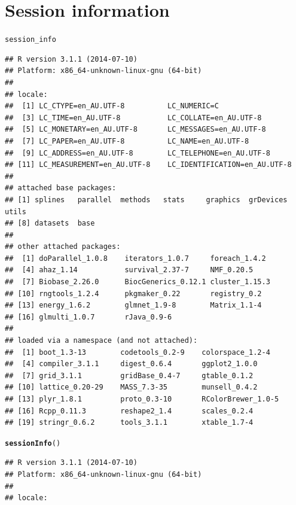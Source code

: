 \documentclass{article}\usepackage[]{graphicx}\usepackage[]{color}
\makeatletter
\newcommand{\hlstd}[1]{\textcolor[rgb]{0.345,0.345,0.345}{#1}}%
\newcommand{\hlkwd}[1]{\textcolor[rgb]{0.737,0.353,0.396}{\textbf{#1}}}%
\newenvironment{kframe}{%
 \def\at@end@of@kframe{}%
 \ifinner\ifhmode%
  \def\at@end@of@kframe{\end{minipage}}%
  \begin{minipage}{\columnwidth}%
 \fi\fi%
 \def\FrameCommand##1{\hskip\@totalleftmargin \hskip-\fboxsep
 \colorbox{shadecolor}{##1}\hskip-\fboxsep
     \hskip-\linewidth \hskip-\@totalleftmargin \hskip\columnwidth}%
 \MakeFramed {\advance\hsize-\width
   \@totalleftmargin\z@ \linewidth\hsize
   \@setminipage}}%
 {\par\unskip\endMakeFramed%
 \at@end@of@kframe}
\newenvironment{knitrout}{}{} %
\makeatother
\begin{document}
\section{Session information}
\begin{knitrout}
\color{fgcolor}\begin{kframe}
\begin{alltt}
\hlstd{session_info}
\end{alltt}
\begin{verbatim}
## R version 3.1.1 (2014-07-10)
## Platform: x86_64-unknown-linux-gnu (64-bit)
## 
## locale:
##  [1] LC_CTYPE=en_AU.UTF-8          LC_NUMERIC=C                 
##  [3] LC_TIME=en_AU.UTF-8           LC_COLLATE=en_AU.UTF-8       
##  [5] LC_MONETARY=en_AU.UTF-8       LC_MESSAGES=en_AU.UTF-8      
##  [7] LC_PAPER=en_AU.UTF-8          LC_NAME=en_AU.UTF-8          
##  [9] LC_ADDRESS=en_AU.UTF-8        LC_TELEPHONE=en_AU.UTF-8     
## [11] LC_MEASUREMENT=en_AU.UTF-8    LC_IDENTIFICATION=en_AU.UTF-8
## 
## attached base packages:
## [1] splines   parallel  methods   stats     graphics  grDevices utils    
## [8] datasets  base     
## 
## other attached packages:
##  [1] doParallel_1.0.8    iterators_1.0.7     foreach_1.4.2      
##  [4] ahaz_1.14           survival_2.37-7     NMF_0.20.5         
##  [7] Biobase_2.26.0      BiocGenerics_0.12.1 cluster_1.15.3     
## [10] rngtools_1.2.4      pkgmaker_0.22       registry_0.2       
## [13] energy_1.6.2        glmnet_1.9-8        Matrix_1.1-4       
## [16] glmulti_1.0.7       rJava_0.9-6        
## 
## loaded via a namespace (and not attached):
##  [1] boot_1.3-13        codetools_0.2-9    colorspace_1.2-4  
##  [4] compiler_3.1.1     digest_0.6.4       ggplot2_1.0.0     
##  [7] grid_3.1.1         gridBase_0.4-7     gtable_0.1.2      
## [10] lattice_0.20-29    MASS_7.3-35        munsell_0.4.2     
## [13] plyr_1.8.1         proto_0.3-10       RColorBrewer_1.0-5
## [16] Rcpp_0.11.3        reshape2_1.4       scales_0.2.4      
## [19] stringr_0.6.2      tools_3.1.1        xtable_1.7-4
\end{verbatim}
\begin{alltt}
\hlkwd{sessionInfo}\hlstd{()}
\end{alltt}
\begin{verbatim}
## R version 3.1.1 (2014-07-10)
## Platform: x86_64-unknown-linux-gnu (64-bit)
## 
## locale:

\end{verbatim}
\end{kframe}
\end{knitrout}
\end{document}
